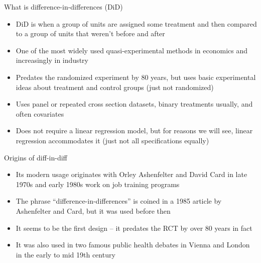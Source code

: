 \documentclass{beamer}
\begin{document}
\begin{frame}{What is difference-in-differences (DiD)}

\begin{itemize}
\item DiD is when a group of units are assigned some treatment and then compared to a group of units that weren't before and after
\item One of the most widely used quasi-experimental methods in economics and increasingly in industry
\item Predates the randomized experiment by 80 years, but uses basic experimental ideas about treatment and control groups (just not randomized)
\item Uses panel or repeated cross section datasets, binary treatments usually, and often covariates 
\item Does not require a linear regression model, but for reasons we will see, linear regression accommodates it (just not all specifications equally)

\end{itemize}
\end{frame}


\begin{frame}{Origins of diff-in-diff}

\begin{itemize}
\item Its modern usage originates with Orley Ashenfelter and David Card in late 1970s and early 1980s work on job training programs
\item The phrase ``difference-in-differences'' is coined in a 1985 article by Ashenfelter and Card, but it was used before then
\item It seems to be the first design -- it predates the RCT by over 80 years in fact
\item It was also used in two famous public health debates in Vienna and London in the early to mid 19th century

\end{itemize}
\end{frame}
\end{document}
